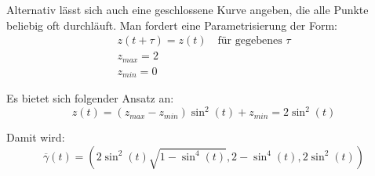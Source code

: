 \documentclass[a4paper,german,12pt,smallheadings]{scrartcl}
\begin{document}
Alternativ lässt sich auch eine geschlossene Kurve angeben, die alle Punkte beliebig oft durchläuft. Man fordert eine Parametrisierung der Form:
\begin{align*}
z(t+\tau)=z(t) \quad \text{für gegebenes $\tau$}\\
z_{max}=2\\
z_{min}=0
\end{align*}

Es bietet sich folgender Ansatz an:
\begin{equation*}
z(t)=(z_{max}-z_{min})\sin^2(t)+z_{min}=2\sin^2(t)
\end{equation*}

Damit wird:
\begin{equation*}
\overline{\gamma}(t)=\left(2\sin^2(t)\sqrt{1-\sin^4(t)},2-\sin^4(t),2\sin^2(t)\right)
\end{equation*}
\end{document}
